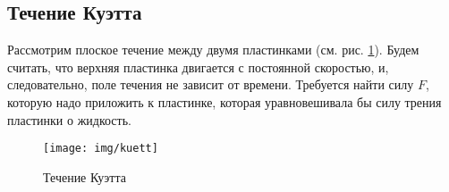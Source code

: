




\subsection{Течение Куэтта}
Рассмотрим плоское течение между двумя пластинками (см. рис. \ref{fig:kuett}). Будем считать, что верхняя пластинка двигается с постоянной скоростью, и, следовательно, поле течения не зависит от времени. Требуется найти силу $F$, которую надо приложить к пластинке, которая уравновешивала бы силу трения пластинки о жидкость.
\begin{figure}[ht!]
    \centering
    \texttt{[image: img/kuett]}
    \caption{Течение Куэтта}
    \label{fig:kuett}
\end{figure}

